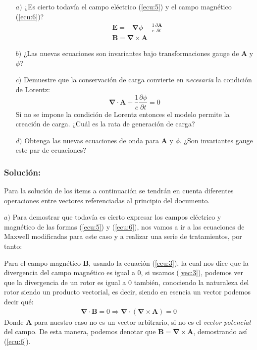 \begin{multicols}{2}
\begin{itemize}[leftmargin=15pt]
    \item[$a)$] ¿Es cierto todavía el campo eléctrico (\ref{ecu:5}) y el campo magnético (\ref{ecu:6})?
    \begin{align}
        &\mathbf{E} = - \mathbf{\nabla} \phi - \frac{1}{c} \frac{\partial \mathbf{A}}{\partial t} \label{ecu:5}\\
        &\mathbf{B} = \mathbf{\nabla} \times \mathbf{A} \label{ecu:6}
    \end{align}
    \item[$b)$] ¿Las nuevas ecuaciones son invariantes bajo transformaciones gauge de $\mathbf{A}$ y $\phi$?
    \item[$c)$] Demuestre que la conservación de carga convierte en \textit{necesaria} la condición de Lorentz:
    \begin{equation*}
        \mathbf{\nabla} \cdot \mathbf{A} + \frac{1}{c} \frac{\partial \phi}{\partial t} = 0 
    \end{equation*}
    Si no se impone la condición de Lorentz entonces el modelo permite la creación de carga. ¿Cuál es la rata de generación de carga?
    \item[$d)$] Obtenga las nuevas ecuaciones de onda para $\mathbf{A}$ y $\phi$. ¿Son invariantes gauge este par de ecuaciones?
\end{itemize}

\subsubsection*{Solución:}

Para la solución de los ítems a continuación se tendrán en cuenta diferentes operaciones entre vectores referenciadas al principio del documento.

$a)$ Para demostrar que todavía es cierto expresar los campos eléctrico y magnético de las formas (\ref{ecu:5}) y (\ref{ecu:6}), nos vamos a ir a las ecuaciones de Maxwell modificadas para este caso y a realizar una serie de tratamientos, por tanto:

Para el campo magnético $\mathbf{B}$, usando la ecuación (\ref{ecu:3}), la cual nos dice que la divergencia del campo magnético es igual a 0, si usamos (\ref{vec:3}), podemos ver que la divergencia de un rotor es igual a 0 también, conociendo la naturaleza del rotor siendo un producto vectorial, es decir, siendo en esencia un vector podemos decir qué:
\begin{align*}
    \mathbf{\nabla} \cdot \mathbf{B} = 0 \Rightarrow \mathbf{\nabla} \cdot \left(\mathbf{\nabla} \times \mathbf{A}\right) = 0
\end{align*}
Donde $\mathbf{A}$ para nuestro caso no es un vector arbitrario, si no es el \textit{vector potencial} del campo. De esta manera, podemos denotar que \textcolor{rojo}{$\mathbf{B} = \mathbf{\nabla} \times \mathbf{A}$}, demostrando así (\ref{ecu:6}).


\end{multicols}
